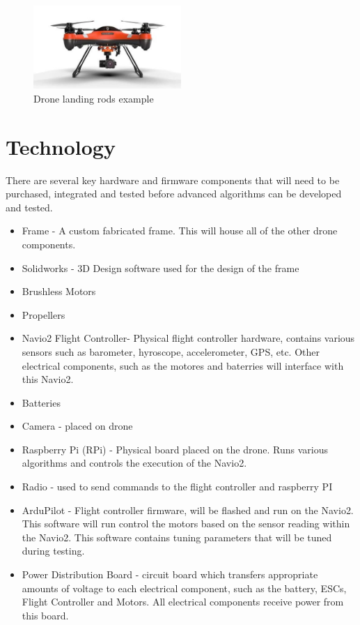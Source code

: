\documentclass{article}
\begin{document}
\begin{figure}[h!]
  \begin{center} 
  \caption{Drone landing rods example} 
 
        \includegraphics[width=0.5\textwidth]{drone.jpg}
  \end{center}
\end{figure}


\section{Technology}
There are several key hardware and firmware components that will need to be purchased, integrated and tested before advanced algorithms can be developed and tested.  
\begin{itemize}
    \item Frame - A custom fabricated frame. This will house all of the other drone components.
\item Solidworks - 3D Design software used for the design of the frame
\item Brushless Motors
\item Propellers
\item Navio2 Flight Controller- Physical flight controller hardware, contains various sensors such as barometer, hyroscope, accelerometer, GPS, etc. Other electrical components, such as the motores and baterries will interface with this Navio2. 
\item Batteries
\item Camera - placed on drone
\item Raspberry Pi (RPi) - Physical board placed on the drone. Runs various algorithms and controls the execution of the Navio2. 
\item Radio - used to send commands to the flight controller and raspberry PI
\item ArduPilot - Flight controller firmware, will be flashed and run on the Navio2. This software will run control the motors based on the sensor reading within the Navio2. This software contains tuning parameters that will be tuned during testing.
\item Power Distribution Board - circuit board which transfers appropriate amounts of voltage to each electrical component, such as the battery, ESCs, Flight Controller and Motors. All electrical components receive power from this board. 
\end{itemize}
\end{document}
